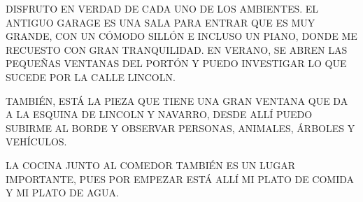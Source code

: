 \newpage
{}

DISFRUTO EN VERDAD DE CADA UNO DE LOS AMBIENTES. EL ANTIGUO GARAGE ES UNA SALA PARA ENTRAR QUE ES MUY GRANDE, CON UN CÓMODO SILLÓN E INCLUSO UN PIANO, DONDE ME RECUESTO CON GRAN TRANQUILIDAD. EN VERANO, SE ABREN LAS PEQUEÑAS VENTANAS DEL PORTÓN Y PUEDO INVESTIGAR LO QUE SUCEDE POR LA CALLE LINCOLN.

TAMBIÉN, ESTÁ LA PIEZA QUE TIENE UNA GRAN VENTANA QUE DA A LA ESQUINA DE LINCOLN Y NAVARRO, DESDE ALLÍ PUEDO SUBIRME AL BORDE Y OBSERVAR PERSONAS, ANIMALES, ÁRBOLES Y VEHÍCULOS.

LA COCINA JUNTO AL COMEDOR TAMBIÉN ES UN LUGAR IMPORTANTE, PUES POR EMPEZAR ESTÁ ALLÍ MI PLATO DE COMIDA Y MI PLATO DE AGUA.


